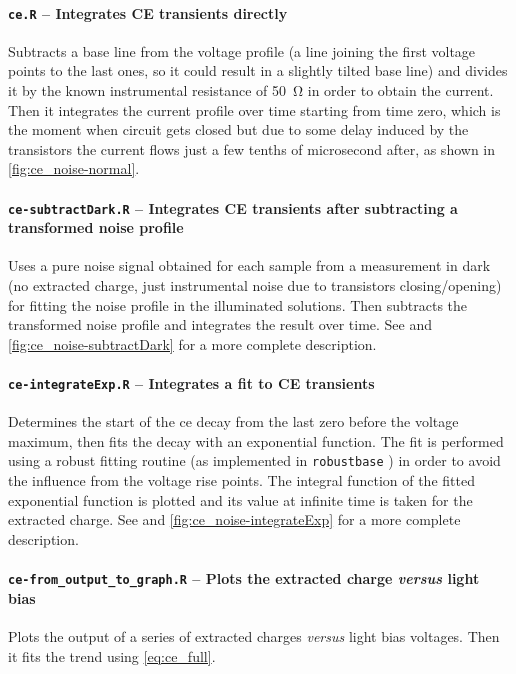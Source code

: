 		\paragraph{\texttt{ce.R} -- Integrates CE transients directly}
		Subtracts a base line from the voltage profile (a line joining the first voltage points to the last ones, so it could result in a slightly tilted base line) and divides it by the known instrumental resistance of \SI{50}{\ohm} in order to obtain the current.
		Then it integrates the current profile over time starting from time zero, which is the moment when circuit gets closed but due to some delay induced by the transistors the current flows just a few tenths of microsecond after, as shown in \cref{fig:ce_noise-normal}.

		\paragraph{\texttt{ce-subtractDark.R} -- Integrates CE transients after subtracting a transformed noise profile}
		Uses a pure noise signal obtained for each sample from a measurement in dark (no extracted charge, just instrumental noise due to transistors closing/opening) for fitting the noise profile in the illuminated solutions.
		Then subtracts the transformed noise profile and integrates the result over time.
		See  and \cref{fig:ce_noise-subtractDark} for a more complete description.
		
		\paragraph{\texttt{ce-integrateExp.R} -- Integrates a fit to CE transients}
		Determines the start of the \gls{ce} decay from the last zero before the voltage maximum, then fits the decay with an exponential function.
		The fit is performed using a robust fitting routine (as implemented in \texttt{robustbase} \cite{Maechler2018}) in order to avoid the influence from the voltage rise points.
		The integral function of the fitted exponential function is plotted and its value at infinite time is taken for the extracted charge.
				See  and \cref{fig:ce_noise-integrateExp} for a more complete description.
				
		\paragraph{\texttt{ce-from\_output\_to\_graph.R} -- Plots the extracted charge \textsl{versus} light bias}
		Plots the output of a series of extracted charges \textsl{versus} light bias voltages.
		Then it fits the trend using \cref{eq:ce_full}.
		
